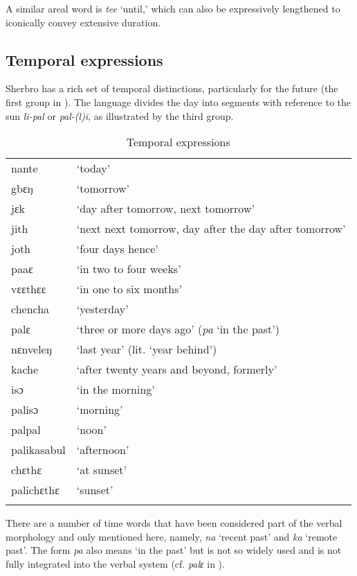 A similar areal word is \textit{tee} ‘until,' which can also be expressively lengthened to iconically convey extensive duration.

\subsection{Temporal expressions}
\label{sec:3.10.3}\hypertarget{Toc115517777}{}
Sherbro has a rich set of temporal distinctions, particularly for the future (the first group in ). The language divides the day into segments with reference to the sun \textit{li-pal} or \textit{pal-(l)i}, as illustrated by the third group.

\begin{table}
\caption{\label{tab:wordcat:22}Temporal expressions}



\begin{tabular}{ll}
\lsptoprule
nante & ‘today'\\
gbɛŋ & ‘tomorrow'\\
jɛk & ‘day after tomorrow, next tomorrow'\\
jith & ‘next next tomorrow, day after the day after tomorrow'\\
joth & ‘four days hence'\\
paaɛ & ‘in two to four weeks'\\
vɛɛthɛɛ & ‘in one to six months'\\
\tablevspace
chencha & ‘yesterday'\\
palɛ & ‘three or more days ago' (\textit{pa} ‘in the past')\\
nɛnveleŋ & ‘last year' (lit. ‘year behind')\\
kache & ‘after twenty years and beyond, formerly'\\
\tablevspace
isɔ & ‘in the morning'\\
palisɔ & ‘morning'\\
palpal & ‘noon'\\
palikasabul & ‘afternoon'\\
chɛthɛ & ‘at sunset'\\
palichɛthɛ & ‘sunset'\\
\lspbottomrule
\end{tabular}
\end{table}

There are a number of time words that have been considered part of the verbal morphology and only mentioned here, namely, \textit{na} ‘recent past' and \textit{ka} ‘remote past'. The form \textit{pa} also means ‘in the past' but is not so widely used and is not fully integrated into the verbal system (cf. \textit{palɛ} in ).

